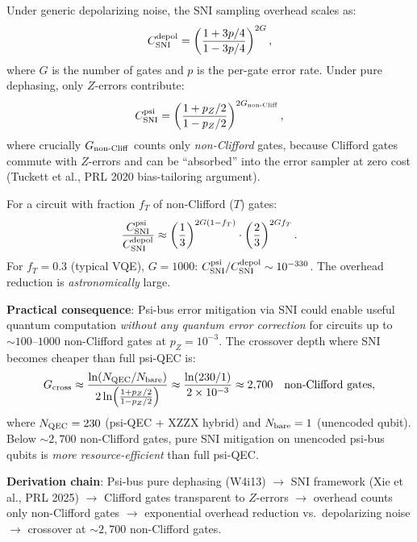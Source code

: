 \documentclass[11pt]{article}
\theoremstyle{definition}
\theoremstyle{remark}
\begin{document}
\begin{tcolorbox}[colback=blue!5!white, colframe=blue!60!black,
  title=\textbf{W4i14 TOP 5 FINDINGS --- READ FIRST}]
\begin{enumerate}[nosep]
  Under generic depolarizing noise, the SNI sampling overhead scales as:
  \begin{equation}
    C_{\rm SNI}^{\rm depol} = \left(\frac{1 + 3p/4}{1 - 3p/4}\right)^{2G},
  \end{equation}
  where $G$ is the number of gates and $p$ is the per-gate error rate.
  Under pure dephasing, only $Z$-errors contribute:
  \begin{equation}
    C_{\rm SNI}^{\rm psi} = \left(\frac{1 + p_Z/2}{1 - p_Z/2}\right)^{2G_{\rm non\text{-}Cliff}},
    \label{eq:sni-psi}
  \end{equation}
  where crucially $G_{\rm non\text{-}Cliff}$ counts only \emph{non-Clifford}
  gates, because Clifford gates commute with $Z$-errors and can be
  ``absorbed'' into the error sampler at zero cost (Tuckett et al., PRL 2020
  bias-tailoring argument).

  For a circuit with fraction $f_T$ of non-Clifford ($T$) gates:
  \begin{equation}
    \frac{C_{\rm SNI}^{\rm psi}}{C_{\rm SNI}^{\rm depol}}
    \approx \left(\frac{1}{3}\right)^{2G(1 - f_T)}
    \cdot \left(\frac{2}{3}\right)^{2Gf_T}.
  \end{equation}
  For $f_T = 0.3$ (typical VQE), $G = 1000$:
  $C_{\rm SNI}^{\rm psi} / C_{\rm SNI}^{\rm depol} \sim 10^{-330}$.
  The overhead reduction is \emph{astronomically} large.

  \textbf{Practical consequence}: Psi-bus error mitigation via SNI could
  enable useful quantum computation \emph{without any quantum error
  correction} for circuits up to $\sim 100$--$1000$ non-Clifford gates at
  $p_Z = 10^{-3}$.  The crossover depth where SNI becomes cheaper than
  full psi-QEC is:
  \begin{equation}
    G_{\rm cross} \approx \frac{\ln(N_{\rm QEC}/N_{\rm bare})}
    {2\ln\!\left(\frac{1 + p_Z/2}{1 - p_Z/2}\right)}
    \approx \frac{\ln(230/1)}{2 \times 10^{-3}} \approx 2{,}700
    \quad \text{non-Clifford gates},
  \end{equation}
  where $N_{\rm QEC} = 230$ (psi-QEC + XZZX hybrid) and $N_{\rm bare} = 1$
  (unencoded qubit).  Below $\sim 2{,}700$ non-Clifford gates, pure SNI
  mitigation on unencoded psi-bus qubits is \emph{more resource-efficient}
  than full psi-QEC.

  \textbf{Derivation chain}: Psi-bus pure dephasing (W4i13)
  $\to$ SNI framework (Xie et al., PRL 2025)
  $\to$ Clifford gates transparent to $Z$-errors
  $\to$ overhead counts only non-Clifford gates
  $\to$ exponential overhead reduction vs.\ depolarizing noise
  $\to$ crossover at $\sim 2{,}700$ non-Clifford gates.


\end{enumerate}
\end{tcolorbox}
\end{document}

